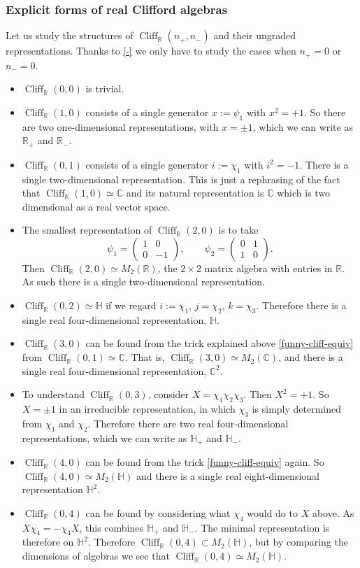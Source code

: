 \documentclass[12pt]{article}
\numberwithin{equation}{section}
\numberwithin{figure}{section}
\theoremstyle{remark}
\def\bC{\mathbb{C}}
\def\bH{\mathbb{H}}
\def\bR{\mathbb{R}}
\def\Cliff{\mathop{\mathrm{Cliff}}\nolimits}
\begin{document}
\subsubsection{Explicit forms of real Clifford algebras}
Let us study the structures of $\Cliff_\bR(n_+,n_-)$ and their ungraded representations.
Thanks to \eqref{-} we only have to study the cases when $n_+=0$ or $n_-=0$.
\begin{itemize}
\item 
$\Cliff_\bR(0,0)$ is trivial.
\item 
$\Cliff_\bR(1,0)$ consists of a single generator  $x:=\psi_1$ with $x^2=+1$.
So there are two one-dimensional representations, with $x=\pm1$,
which we can write as $\bR_+$ and $\bR_-$.
\item 
$\Cliff_\bR(0,1)$ consists of a single generator  $i:=\chi_1$ with $i^2=-1$.
There is a single two-dimensional representation.
This is just a rephrasing of the fact that  $\Cliff_\bR(1,0)\simeq \bC$ and 
its natural representation is $\bC$ which is two dimensional as a real vector space.
\item The smallest representation of $\Cliff_\bR(2,0)$  is to take \begin{equation}
\psi_1 = \begin{pmatrix}
1 & 0 \\
0 & -1
\end{pmatrix} ,\qquad 
\psi_2 = \begin{pmatrix}
0 & 1 \\
1 & 0
\end{pmatrix}.
\end{equation}
Then $\Cliff_\bR(2,0)\simeq M_2(\bR)$, the $2\times 2$ matrix algebra with entries in $\bR$.
As such there is a single two-dimensional representation.
\item
$\Cliff_\bR(0,2)\simeq \bH$ if we regard $i:=\chi_1$, $j=\chi_2$, $k=\chi_3$.
Therefore there is a single real four-dimensional representation, $\bH$.
\item
$\Cliff_\bR(3,0)$  can be found from the trick explained above \eqref{funny-cliff-equiv} 
from $\Cliff_\bR(0,1)\simeq \bC$. 
That is, $\Cliff_\bR(3,0)\simeq M_2(\bC)$,
and there is a single real four-dimensional representation, $\bC^2$. 
\item 
To understand $\Cliff_\bR(0,3)$, consider $X=\chi_1\chi_2\chi_3$. 
Then $X^2=+1$. So $X=\pm 1$ in an irreducible representation,
in which $\chi_3$  is simply determined from $\chi_1$ and $\chi_2$.
Therefore there are two real four-dimensional representations,
which we can write as $\bH_+$ and $\bH_-$.
\item 
$\Cliff_\bR(4,0)$ can be found from the trick \eqref{funny-cliff-equiv} again.
So $\Cliff_\bR(4,0)\simeq M_2(\bH)$
and there is a single real eight-dimensional representation $\bH^2$.
\item
$\Cliff_\bR(0,4)$ can be found by considering what $\chi_4$ would do to $X$ above.
As $X\chi_4=-\chi_4X$, this combines $\bH_+$ and $\bH_-$.
The minimal representation is therefore on $\bH^2$.
Therefore $\Cliff_\bR(0,4)\subset M_2(\bH)$, but by comparing the dimensions of algebras we see that 
$\Cliff_\bR(0,4)\simeq M_2(\bH)$.
\end{itemize}
\end{document}
